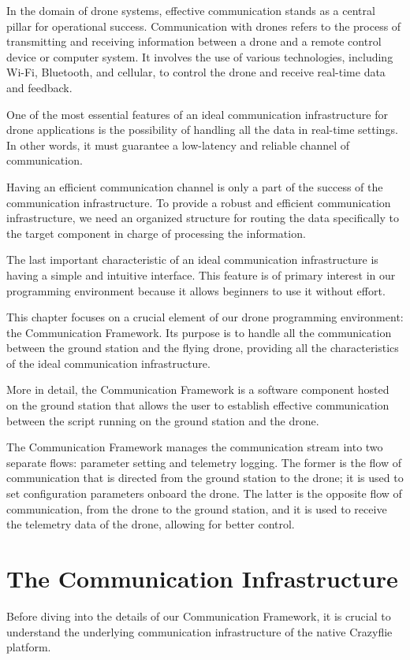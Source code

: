 In the domain of drone systems, effective communication stands as a central pillar for operational success.
Communication with drones refers to the process of transmitting and receiving information between a drone and a remote control device or computer system. 
It involves the use of various technologies, including Wi-Fi, Bluetooth, and cellular, to control the drone and receive real-time data and feedback.

One of the most essential features of an ideal communication infrastructure for drone applications is the possibility of handling all the data in real-time settings.
In other words, it must guarantee a low-latency and reliable channel of communication.

Having an efficient communication channel is only a part of the success of the communication infrastructure. 
To provide a robust and efficient communication infrastructure, we need an organized structure for routing the data specifically to the target component in charge of processing the information.

The last important characteristic of an ideal communication infrastructure is having a simple and intuitive interface.
This feature is of primary interest in our programming environment because it allows beginners to use it without effort.

This chapter focuses on a crucial element of our drone programming environment: the Communication Framework. 
Its purpose is to handle all the communication between the ground station and the flying drone, providing all the characteristics of the ideal communication infrastructure.

More in detail, the Communication Framework is a software component hosted on the ground station 
that allows the user to establish effective communication between the script running on the ground station and the drone.

The Communication Framework manages the communication stream into two separate flows: parameter setting and telemetry logging.
The former is the flow of communication that is directed from the ground station to the drone; it is used to set configuration parameters onboard the drone.
The latter is the opposite flow of communication, from the drone to the ground station, and it is used to receive the telemetry data of the drone, allowing for better control.


\section{The Communication Infrastructure}\label{sec:communication_infrastructure}
Before diving into the details of our Communication Framework, it is crucial to understand the underlying communication infrastructure of the native Crazyflie platform.

